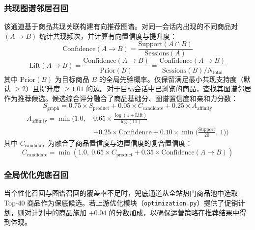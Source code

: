 \subsubsection{共现图谱邻居召回}

该通道基于商品共现关联构建有向推荐图谱。对同一会话内出现的不同商品对 $(A \to B)$ 统计共现频次，并计算有向置信度与提升度：
\begin{equation}
    \text{Confidence}(A \to B) = \frac{\text{Support}(A \cap B)}{\text{Sessions}(A)}
    \label{eq:edge-confidence}
\end{equation}
\begin{equation}
    \text{Lift}(A \to B) = \frac{\text{Confidence}(A \to B)}{\text{Prior}(B)} = \frac{\text{Confidence}(A \to B)}{\text{Sessions}(B) / N_{\text{total}}}
    \label{eq:edge-lift}
\end{equation}
其中 $\text{Prior}(B)$ 为目标商品 $B$ 的全局先验概率。仅保留满足最小共现支持度（默认 $\geq 2$）且提升度 $\geq 1.01$ 的边。对于目标会话中已浏览的商品，查找其图谱邻居作为推荐候选。候选综合评分融合了商品基础分、图谱置信度和亲和力分数：
\begin{equation}
    S_{\text{graph}} = 0.75 \times S_{\text{product}} + 0.05 \times C_{\text{candidate}} + 0.25 \times A_{\text{affinity}}
    \label{eq:graph-candidate-score}
\end{equation}
\begin{equation}
    \begin{aligned}
        A_{\text{affinity}} = \min\bigg(1.0,\  & 0.65 \times \frac{\log(1 + \text{Lift})}{\log(11)} \\
                                               & + 0.25 \times \text{Confidence}
        + 0.10 \times \min\Big(\frac{\text{Support}}{20},\, 1\Big)\bigg)
    \end{aligned}
    \label{eq:affinity-score}
\end{equation}
其中 $C_{\text{candidate}}$ 为融合了商品置信度与边置信度的复合置信度：
\begin{equation}
    C_{\text{candidate}} = \min\left(1.0,\ 0.65 \times C_{\text{product}} + 0.35 \times \text{Confidence}(A \to B)\right)
    \label{eq:candidate-confidence}
\end{equation}

\subsubsection{全局优化兜底召回}

当个性化召回与图谱召回的覆盖率不足时，兜底通道从全站热门商品池中选取 Top-40 商品作为保底候选。若上游优化模块（\texttt{optimization.py}）提供了促销计划，则对计划中的商品施加 $+0.04$ 的分数加成，以确保运营策略在推荐结果中得到体现。

